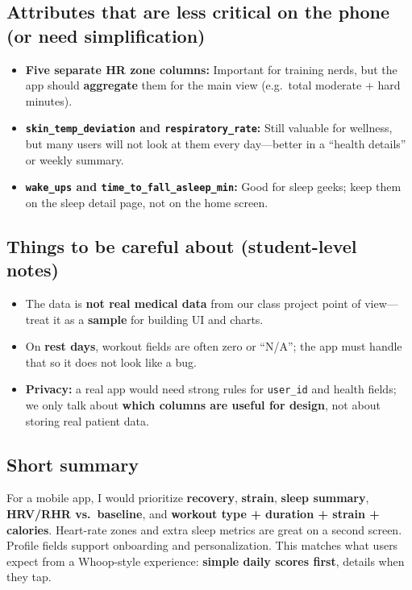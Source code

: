 \documentclass[11pt,a4paper]{article}
\begin{document}
\subsection{Attributes that are less critical on the phone (or need simplification)}
\begin{itemize}[leftmargin=*]
  \item \textbf{Five separate HR zone columns:} Important for training nerds, but the app should \textbf{aggregate} them for the main view (e.g.\ total moderate + hard minutes).
  \item \textbf{\texttt{skin\_temp\_deviation} and \texttt{respiratory\_rate}:} Still valuable for wellness, but many users will not look at them every day---better in a ``health details'' or weekly summary.
  \item \textbf{\texttt{wake\_ups} and \texttt{time\_to\_fall\_asleep\_min}:} Good for sleep geeks; keep them on the sleep detail page, not on the home screen.
\end{itemize}

\subsection{Things to be careful about (student-level notes)}
\begin{itemize}[leftmargin=*]
  \item The data is \textbf{not real medical data} from our class project point of view---treat it as a \textbf{sample} for building UI and charts.
  \item On \textbf{rest days}, workout fields are often zero or ``N/A''; the app must handle that so it does not look like a bug.
  \item \textbf{Privacy:} a real app would need strong rules for \texttt{user\_id} and health fields; we only talk about \textbf{which columns are useful for design}, not about storing real patient data.
\end{itemize}

\subsection{Short summary}
For a mobile app, I would prioritize \textbf{recovery}, \textbf{strain}, \textbf{sleep summary}, \textbf{HRV/RHR vs.\ baseline}, and \textbf{workout type + duration + strain + calories}. Heart-rate zones and extra sleep metrics are great on a second screen. Profile fields support onboarding and personalization. This matches what users expect from a Whoop-style experience: \textbf{simple daily scores first}, details when they tap.
\end{document}
